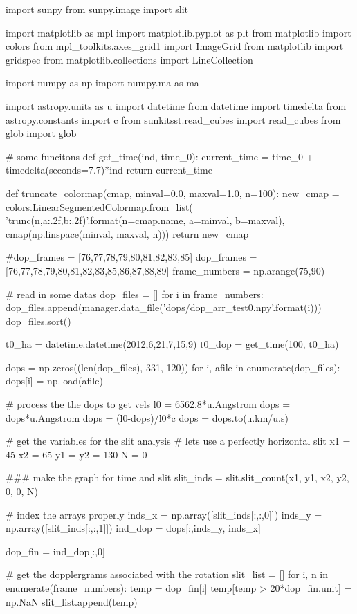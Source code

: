 \documentclass{emulateapj}
\begin{document}
\begin{pycode}[DOPPLER]
import sunpy
from sunpy.image import slit

import matplotlib as mpl
import matplotlib.pyplot as plt
from matplotlib import colors
from mpl_toolkits.axes_grid1 import ImageGrid
from matplotlib import gridspec
from matplotlib.collections import LineCollection

import numpy as np
import numpy.ma as ma

import astropy.units as u
import datetime
from datetime import timedelta
from astropy.constants import c
from sunkitsst.read_cubes import read_cubes
from glob import glob

# some funcitons
def get_time(ind, time_0):
    current_time = time_0 + timedelta(seconds=7.7)*ind
    return current_time

def truncate_colormap(cmap, minval=0.0, maxval=1.0, n=100):
    new_cmap = colors.LinearSegmentedColormap.from_list(
        'trunc({n},{a:.2f},{b:.2f})'.format(n=cmap.name, a=minval, b=maxval),
        cmap(np.linspace(minval, maxval, n)))
    return new_cmap


#dop_frames = [76,77,78,79,80,81,82,83,85]
dop_frames = [76,77,78,79,80,81,82,83,85,86,87,88,89]
frame_numbers = np.arange(75,90)

# read in some datas
dop_files = []
for i in frame_numbers:
    dop_files.append(manager.data_file('dops/dop_arr_test0{}.npy'.format(i)))
dop_files.sort()

t0_ha = datetime.datetime(2012,6,21,7,15,9)
t0_dop = get_time(100, t0_ha)

dops = np.zeros((len(dop_files), 331, 120))
for i, afile in enumerate(dop_files):
    dops[i] = np.load(afile)

# process the the dops to get vels
l0 = 6562.8*u.Angstrom
dops = dops*u.Angstrom
dops = (l0-dops)/l0*c
dops = dops.to(u.km/u.s)

# get the variables for the slit analysis
# lets use a perfectly horizontal slit
x1 = 45
x2 = 65
y1 = y2 = 130
N = 0


### make the graph for time and slit
slit_inds = slit.slit_count(x1, y1, x2, y2, 0, 0, N)

# index the arrays properly
inds_x = np.array([slit_inds[:,:,0]])
inds_y = np.array([slit_inds[:,:,1]])
ind_dop = dops[:,inds_y, inds_x]

dop_fin = ind_dop[:,0]

# get the dopplergrams associated with the rotation
slit_list = []
for i, n in enumerate(frame_numbers):
    temp = dop_fin[i]
    temp[temp > 20*dop_fin.unit] = np.NaN
    slit_list.append(temp)


\end{pycode}
\end{document}
